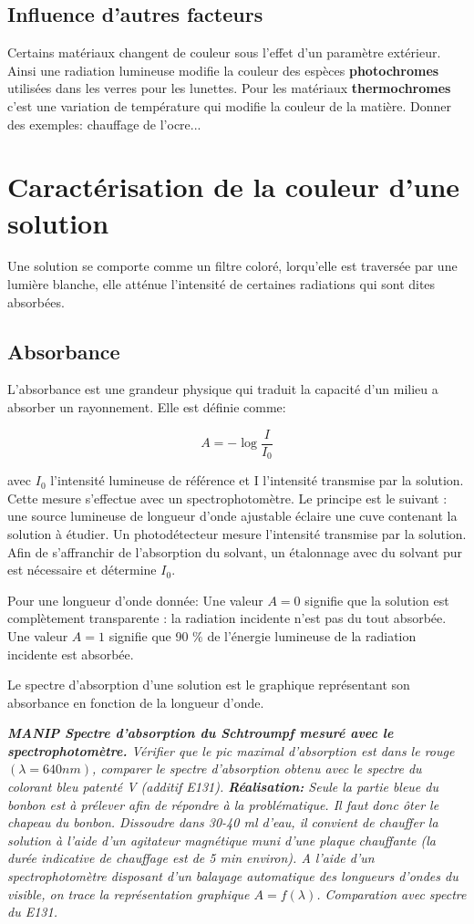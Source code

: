 \documentclass{article}
\begin{document}
\subsection{Influence d'autres facteurs}
Certains matériaux changent de couleur sous l'effet d'un paramètre extérieur. Ainsi une radiation lumineuse modifie la couleur des espèces \textbf{photochromes} utilisées dans les verres pour les lunettes. Pour les matériaux \textbf{thermochromes} c'est une variation de température qui modifie la couleur de la matière. 
Donner des exemples: chauffage de l'ocre...

\section{Caractérisation de la couleur d'une solution}
Une solution se comporte comme un filtre coloré, lorqu'elle est traversée par une lumière blanche, elle atténue l'intensité de certaines radiations qui sont dites absorbées.
\subsection{Absorbance}
L'absorbance est une grandeur physique qui traduit la capacité d'un milieu a absorber un rayonnement. Elle est définie comme:

\begin{equation}
    A = -\log{\frac{I}{I_0}}
\end{equation}

avec $I_0$ l’intensité lumineuse de référence et I l’intensité transmise par la solution. Cette mesure s’effectue avec un spectrophotomètre. Le principe est le suivant : une source lumineuse de longueur d’onde ajustable éclaire une cuve contenant la solution à étudier. Un photodétecteur mesure l’intensité transmise par la solution. Afin de s’affranchir de l’absorption du solvant, un étalonnage avec du solvant pur est nécessaire et détermine $I_0$.\medskip

Pour une longueur d'onde donnée: Une valeur $A=0$ signifie que la solution est complètement transparente : la radiation incidente n’est pas du tout absorbée. Une valeur $A=1$ signifie que 90 $\%$ de l’énergie lumineuse de la radiation incidente est absorbée. \medskip

Le spectre d'absorption d'une solution est le graphique représentant son absorbance en fonction de la longueur d’onde.\medskip

\textit{\textbf{MANIP Spectre d'absorption du Schtroumpf mesuré avec le spectrophotomètre.} Vérifier que le pic maximal d'absorption est dans le rouge $(\lambda= 640 nm)$, comparer le spectre d'absorption obtenu avec le spectre du colorant bleu patenté V (additif E131). \textbf{Réalisation:} Seule la partie bleue du bonbon est à prélever afin de répondre à la problématique. Il faut donc ôter le chapeau du bonbon. Dissoudre dans 30-40 ml d'eau, il convient de chauffer la solution à l’aide d’un agitateur magnétique muni d’une plaque chauffante (la durée indicative de chauffage est de 5 min environ). A l’aide d’un spectrophotomètre disposant d’un balayage automatique des longueurs d’ondes du visible, on trace la représentation graphique $A= f(\lambda)$. Comparation avec spectre du E131.}
\end{document}

